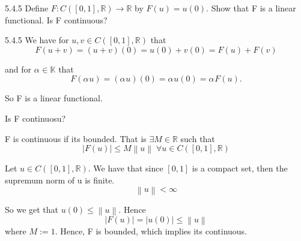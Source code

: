 \documentclass[a4paper,norsk]{article}
\renewcommand{\leq}{\leqslant}
\begin{document}
\begin{oppgavebox}{5.4.5}{}
Define $ F : C \left( \left[ 0, 1 \right] , \mathbb{R} \right) \to \mathbb{R} $ by $ F(u) = u(0) $. Show that F is a linear functional. Is F continuous?

\begin{proofbox}{5.4.5}{}
    We have for $ u, v \in C \left( \left[ 0, 1 \right] , \mathbb{R} \right)  $ that
    \[
        F \left( u+v \right) = \left( u+v \right) (0) = u(0) + v(0) = F(u) + F(v)
    \]
    
    and for $ \alpha_{}^{} \in  \mathbb{K}  $ that
    \[
        F \left( \alpha_{}^{} u \right) = \left( \alpha_{}^{} u \right) (0) = \alpha_{}^{} u(0) = \alpha_{}^{} F(u).
    \]

    So F is a linear functional.


    Is F continuosu?

    F is continuous if its bounded. That is $ \exists M \in \mathbb{R} $ such that
    \[
        \left| F(u) \right| \leq M \left\lVert u \right\rVert \; \forall u \in C \left( \left[ 0, 1 \right] , \mathbb{R} \right) 
    \]

    Let $ u \in C \left( \left[ 0, 1 \right] , \mathbb{R} \right)  $. We have that since $ \left[ 0, 1 \right]  $ is a compact set, then the supremum norm of u is finite.
    \[
        \left\lVert u \right\rVert < \infty
    \]

    So we get that $ u(0) \leq \left\lVert u \right\rVert  $. Hence
    \[
        \left| F(u) \right| = \left| u(0) \right| \leq \left\lVert u \right\rVert 
    \]
    where $ M := 1 $. Hence, F is bounded, which implies its continuous.
\end{proofbox}
\end{oppgavebox}
\end{document}
